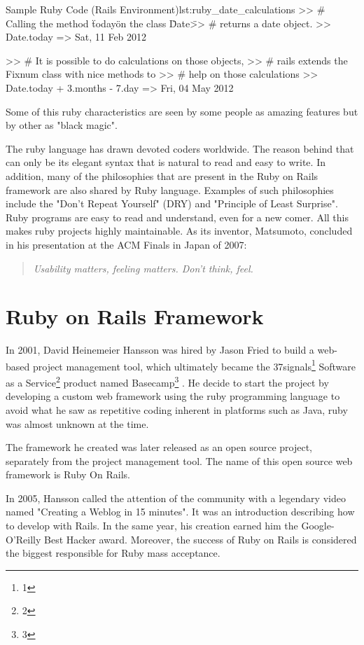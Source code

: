 \begin{rubycode}{Sample Ruby Code (Rails Environment)}{lst:ruby_date_calculations}
  >> # Calling the method \"today\" on the class \"Date\" 
  >> # returns a date object.
  >> Date.today 
  => Sat, 11 Feb 2012

  >> # It is possible to do calculations on those objects, 
  >> # rails extends the Fixnum class with nice methods to 
  >> # help on those calculations
  >> Date.today + 3.months - 7.day
  => Fri, 04 May 2012
\end{rubycode}

Some of this ruby characteristics are seen by some people as amazing features but by other as "black magic".

The ruby language has drawn devoted coders worldwide.
The reason behind that can only be its elegant syntax that is natural to read and easy to write. 
In addition, many of the philosophies that are present in the Ruby on Rails framework are also shared by Ruby language.
Examples of such philosophies include the "Don't Repeat Yourself" (DRY) and "Principle of Least Surprise".
Ruby programs are easy to read and understand, even for a new comer. 
All this makes ruby projects highly maintainable.
As its inventor, Matsumoto, concluded in his presentation at the ACM Finals in Japan of 2007: 
\begin{quote}\emph{
  Usability matters, feeling matters. Don't think, feel.
}\end{quote}




\section{Ruby on Rails Framework} 
In 2001, David Heinemeier Hansson was hired by Jason Fried to build a web-based project management tool, 
which ultimately became the 
\textsf{37signals}\footnote{
 1
}
\textsf{Software as a Service}\footnote{
 2
}  
product named 
\textsf{Basecamp}\footnote{
  3
}
. 
He decide to start the project by developing a custom web framework using the ruby programming language
to avoid what he saw as repetitive coding inherent in platforms such as Java,
ruby was almost unknown at the time.

The framework he created was later released as an open source project, separately from the project management tool. 
The name of this open source web framework is Ruby On Rails.

In 2005, Hansson called the attention of the community with a legendary video named "Creating a Weblog in 15 minutes". 
It was an introduction describing how to develop with Rails.
In the same year, his creation earned him the Google-O'Reilly Best Hacker award.
Moreover, the success of Ruby on Rails is considered the biggest responsible for Ruby mass acceptance.

